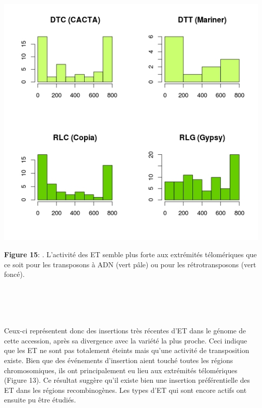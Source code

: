 \documentclass[a4paper, 12pt]{article}
\begin{document}
\begin{onehalfspace}
\begin{multicols}{3}
\begin{center}
\includegraphics[scale=0.33]{pic_Data/fig14.jpeg}
\end{center}
\textbf{Figure 15}: . L'activité des ET semble plus forte aux extrémités télomériques que ce soit pour les transposons à ADN (vert pâle) ou pour les rétrotransposons (vert foncé).\\ ~\\ ~\\ ~\\ ~\\
\end{multicols}
\vfill
\addtocounter{page}{-1}
\newpage

Ceux-ci représentent donc des insertions très récentes d'ET dans le génome de cette accession, après sa divergence avec la variété la plus proche. Ceci indique que les ET ne sont pas totalement éteints mais qu'une activité de transposition existe. Bien que des événements d'insertion aient touché toutes les régions chromosomiques, ils ont principalement eu lieu aux extrémités télomériques (Figure 13). Ce résultat suggère qu'il existe bien une insertion préférentielle des ET dans les régions recombinogènes. Les types d'ET qui sont encore actifs ont ensuite pu être étudiés.


\end{onehalfspace}
\end{document}
